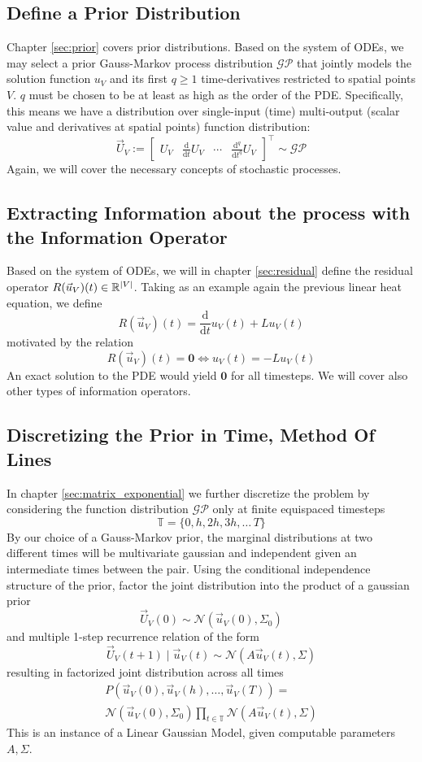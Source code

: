 \subsection*{Define a Prior Distribution}
Chapter \ref{sec:prior} covers prior distributions. Based on the system of ODEs, we may select a prior Gauss-Markov process distribution $\mathcal{GP}$ that jointly models the solution function $u_V$ and its first $q\geq 1$ time-derivatives restricted to spatial points $V$. $q$ must be chosen to be at least as high as the order of the PDE. Specifically, this means we have a distribution over single-input (time) multi-output (scalar value and derivatives at spatial points) function distribution: $$\vec{U}_V :=\begin{bmatrix} U_V & \frac{\text{d}}{\text{d} t} U_V & \cdots & \frac{\text{d}^q}{\text{d} t^q} U_V\end{bmatrix}^{\intercal} \sim \mathcal{GP}$$ Again, we will cover the necessary concepts of stochastic processes.
\subsection*{Extracting Information about the process with the Information Operator}
Based on the system of ODEs, we will in chapter \ref{sec:residual} define the residual operator $R(\vec{u}_V)(t) \in \mathbb{R}^{|V|}$. Taking as an example again the previous linear heat equation, we define $$R(\vec{u}_V)(t) = \frac{\text{d}}{\text{d} t}u_V(t) + L u_V(t)$$ motivated by the relation $$R(\vec{u}_V)(t) = \mathbf{0} \iff u_V(t) = -Lu_V(t)$$ An exact solution to the PDE would yield $\mathbf{0}$ for all timesteps. We will cover also other types of information operators.
\subsection*{Discretizing the Prior in Time, Method Of Lines}
In chapter \ref{sec:matrix_exponential} we further discretize the problem by considering the function distribution $\mathcal{GP}$ only at finite equispaced timesteps $$\mathbb{T} = \{0, h, 2h, 3h, \dots\, T\}$$ 
By our choice of a Gauss-Markov prior, the marginal distributions at two different times will be multivariate gaussian and independent given an intermediate times between the pair. Using the conditional independence structure of the prior, factor the joint distribution into the product of a gaussian prior $$\vec{U}_V(0) \sim \mathcal{N}(\vec{u}_V(0), \Sigma_0)$$ and multiple 1-step recurrence relation of the form $$\vec{U}_V(t+1) \;|\; \vec{u}_V(t) \sim \mathcal{N}(A\vec{u}_V(t), \Sigma)$$ 
resulting in factorized joint distribution across all times 
\begin{align*}
    P(\vec{u}_V(0), \vec{u}_V(h), \dots, \vec{u}_V(T)) = 
    \\ 
    \mathcal{N}(\vec{u}_V(0), \Sigma _0)\prod_{t\in \mathbb{T}} \mathcal{N}(A\vec{u}_V(t), \Sigma)
\end{align*}
This is an instance of a Linear Gaussian Model, given computable parameters $A, \Sigma$.
